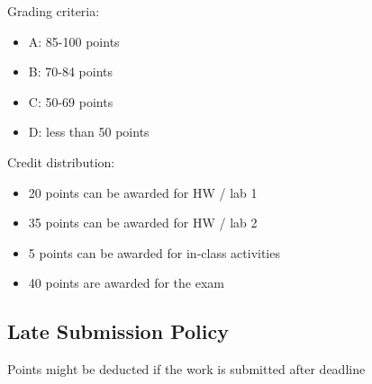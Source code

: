 Grading criteria:
\begin{itemize}
    \item A: 85-100 points
    \item B: 70-84 points
    \item C: 50-69 points
    \item D: less than 50 points
\end{itemize}

Credit distribution:
\begin{itemize}
    \item 20 points can be awarded for HW / lab 1
    \item 35 points can be awarded for HW / lab 2
    \item 5 points can be awarded for in-class activities
    \item 40 points are awarded for the exam
\end{itemize}

\subsection{Late Submission Policy}
Points might be deducted if the work is submitted after deadline
